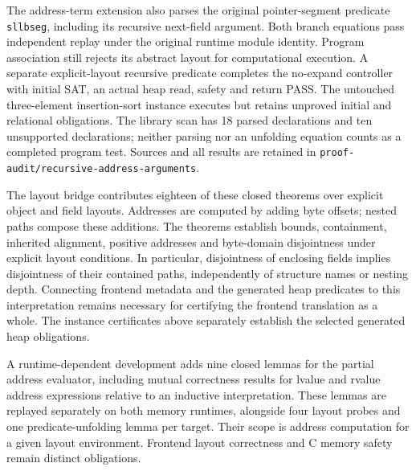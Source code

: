 The address-term extension also parses the original pointer-segment predicate
\texttt{sllbseg}, including its recursive next-field argument. Both branch
equations pass independent replay under the original runtime module identity.
Program association still rejects its abstract layout for computational
execution. A separate explicit-layout recursive predicate completes the
no-expand controller with initial SAT, an actual heap read, safety and return
PASS. The untouched three-element insertion-sort instance executes but retains
unproved initial and relational obligations. The library scan has 18 parsed
declarations and ten unsupported declarations; neither parsing nor an unfolding
equation counts as a completed program test. Sources and all results are retained
in \texttt{proof-audit/recursive-address-arguments}.

The layout bridge contributes eighteen of these closed theorems over explicit
object and field layouts. Addresses are computed by adding byte offsets;
nested paths compose these additions. The theorems establish bounds,
containment, inherited alignment, positive addresses and byte-domain
disjointness under explicit layout conditions. In particular, disjointness of
enclosing fields implies disjointness of their contained paths, independently
of structure names or nesting depth. Connecting frontend metadata and the
generated heap predicates to this interpretation remains necessary for
certifying the frontend translation as a whole. The instance certificates
above separately establish the selected generated heap obligations.

A runtime-dependent development adds nine closed lemmas for the partial address
evaluator, including mutual correctness results for lvalue and rvalue address
expressions relative to an inductive interpretation. These lemmas are replayed
separately on both memory runtimes, alongside four layout probes and one
predicate-unfolding lemma per target. Their scope is address computation for a
given layout environment. Frontend layout correctness and C memory safety
remain distinct obligations.

